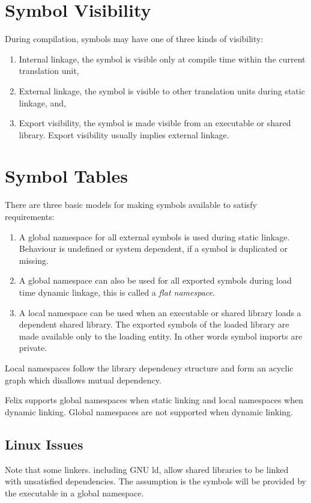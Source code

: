 \documentclass[oneside]{book}
\begin{document}
\section{Symbol Visibility}
During compilation, symbols may have one of three kinds
of visibility:
\begin{enumerate}
\item Internal linkage, the symbol is visible only at compile time 
within the current translation unit,
\item External linkage, the symbol is visible to other translation units 
during static linkage, and,
\item Export visibility, the symbol is made visible from
an executable or shared library.
Export visibility usually implies external linkage.
\end{enumerate}

\section{Symbol Tables}
There are three basic models for making symbols available
to satisfy requirements:

\begin{enumerate}
\item A global namespace for all external symbols is used 
during static linkage. Behaviour is undefined or system dependent,
if a symbol is duplicated or missing. 

\item A global namespace can also be used for all exported
symbols during load time dynamic linkage, this is 
called a {\em flat namespace}.

\item A local namespace can be used when an executable or
shared library loads a dependent shared library.  The exported
symbols of the loaded library are made available only to
the loading entity. In other words symbol imports are private.
\end{enumerate}

Local namespaces follow the library dependency structure
and form an acyclic graph which disallows mutual dependency.

Felix supports global namespaces when static linking and
local namespaces when dynamic linking. Global namespaces
are not supported when dynamic linking. 

\subsection{Linux Issues}
Note that some linkers. including GNU ld,
allow shared libraries to be linked with unsatisfied 
dependencies. The assumption is the symbols will
be provided by the executable in a global namespace.
\end{document}
